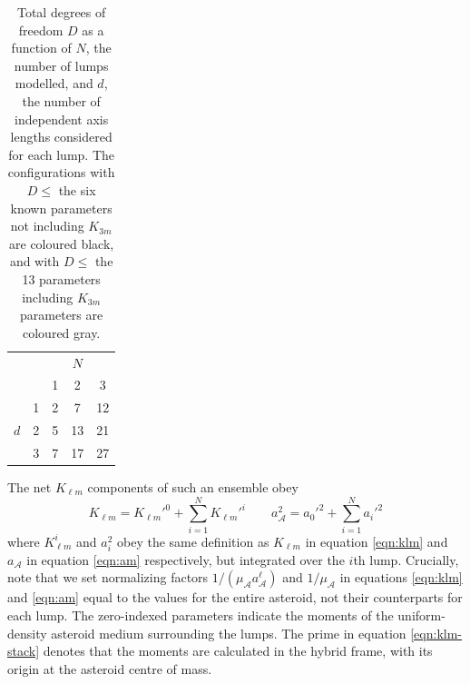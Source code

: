 \documentclass[fleqn,usenatbib]{mnras}
\begin{document}
\begin{table}
  \centering
  \begin{tabular}{cc|ccc}
    \hline \hline
        &  & & $N$ &  \\
        &  & 1  & 2  & 3  \\ \hline 
        & 1& \cellcolor{black}\color{white} 2 & \cellcolor{gray}\color{white} 7 & \cellcolor{gray}\color{white} 12\\
    $d$ & 2& \cellcolor{black}\color{white} 5 & \cellcolor{gray}\color{white} 13 & 21 \\
        & 3& \cellcolor{gray}\color{white}  7 &  17 &  27 \\
    \hline \hline
  \end{tabular}
  \caption{Total degrees of freedom $D$ as a function of $N$, the number of lumps modelled, and $d$, the number of independent axis lengths considered for each lump. The configurations with $D \leq$ the six known parameters not including $K_{3m}$ are coloured black, and with $D \leq$ the 13 parameters including $K_{3m}$ parameters are coloured gray.}
  \label{tab:lump-dof}
\end{table}

The net $K_{\ell m}$ components of such an ensemble obey
\begin{equation}
  K_{\ell m} = K_{\ell m}'^0 + \sum_{i=1}^N K_{\ell m}'^i \qquad a_\mathcal{A}^2 = a_0'^2 + \sum_{i=1}^N a_i'^2
  \label{eqn:klm-stack}
\end{equation}
where $K_{\ell m}^i$ and $a_i^2$ obey the same definition as $K_{\ell m}$ in equation \ref{eqn:klm} and $a_\mathcal{A}$ in equation \ref{eqn:am} respectively, but integrated over the $i$th lump. Crucially, note that we set normalizing factors $1/(\mu_\mathcal{A} a_\mathcal{A}^\ell)$ and $1/\mu_\mathcal{A}$ in equations \ref{eqn:klm} and \ref{eqn:am} equal to the values for the entire asteroid, not their counterparts for each lump. The zero-indexed parameters indicate the moments of the uniform-density asteroid medium surrounding the lumps. The prime in equation \ref{eqn:klm-stack} denotes that the moments are calculated in the hybrid frame, with its origin at the asteroid centre of mass.
\end{document}
